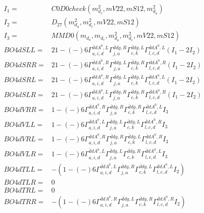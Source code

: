 \documentclass[A4,landscape]{article}
\begin{document}
\begin{align} 
I_1 = & C0D0check(m^2_{d_{{c}}}, mV22, mS12, m^2_{d_{{a}}}) \\ 
I_2 = & D_{27}(m^2_{d_{{a}}}, m^2_{d_{{c}}}, mV22, mS12) \\ 
I_3 = & MMD0(m_{d_{{a}}}, m_{d_{{c}}}, m^2_{d_{{a}}}, m^2_{d_{{c}}}, mV22, mS12) \\ 
  BO4dSLL= & 2   1
-(-)
  6 \Gamma^{\bar{d}d A^0 ,L}_{a, i, d} \Gamma^{\bar{d}d g ,R}_{j, a} \Gamma^{\bar{d}d g ,L}_{c, k} \Gamma^{\bar{d}d A^0 ,L}_{l, c, d} (I_1 - 2 I_2) \\ 
  BO4dSRR= & 2   1
-(-)
  6 \Gamma^{\bar{d}d A^0 ,R}_{a, i, d} \Gamma^{\bar{d}d g ,L}_{j, a} \Gamma^{\bar{d}d g ,R}_{c, k} \Gamma^{\bar{d}d A^0 ,R}_{l, c, d} (I_1 - 2 I_2) \\ 
  BO4dSRL= & 2   1
-(-)
  6 \Gamma^{\bar{d}d A^0 ,R}_{a, i, d} \Gamma^{\bar{d}d g ,L}_{j, a} \Gamma^{\bar{d}d g ,L}_{c, k} \Gamma^{\bar{d}d A^0 ,L}_{l, c, d} (I_1 - 2 I_2) \\ 
  BO4dSLR= & 2   1
-(-)
  6 \Gamma^{\bar{d}d A^0 ,L}_{a, i, d} \Gamma^{\bar{d}d g ,R}_{j, a} \Gamma^{\bar{d}d g ,R}_{c, k} \Gamma^{\bar{d}d A^0 ,R}_{l, c, d} (I_1 - 2 I_2) \\ 
  BO4dVRR= &   1
-(-)
  6 \Gamma^{\bar{d}d A^0 ,R}_{a, i, d} \Gamma^{\bar{d}d g ,R}_{j, a} \Gamma^{\bar{d}d g ,R}_{c, k} \Gamma^{\bar{d}d A^0 ,L}_{l, c, d} I_3 \\ 
  BO4dVLL= &   1
-(-)
  6 \Gamma^{\bar{d}d A^0 ,L}_{a, i, d} \Gamma^{\bar{d}d g ,L}_{j, a} \Gamma^{\bar{d}d g ,L}_{c, k} \Gamma^{\bar{d}d A^0 ,R}_{l, c, d} I_3 \\ 
  BO4dVRL= &   1
-(-)
  6 \Gamma^{\bar{d}d A^0 ,R}_{a, i, d} \Gamma^{\bar{d}d g ,R}_{j, a} \Gamma^{\bar{d}d g ,L}_{c, k} \Gamma^{\bar{d}d A^0 ,R}_{l, c, d} I_3 \\ 
  BO4dVLR= &   1
-(-)
  6 \Gamma^{\bar{d}d A^0 ,L}_{a, i, d} \Gamma^{\bar{d}d g ,L}_{j, a} \Gamma^{\bar{d}d g ,R}_{c, k} \Gamma^{\bar{d}d A^0 ,L}_{l, c, d} I_3 \\ 
  BO4dTLL= & -(  1
-(-)
  6 \Gamma^{\bar{d}d A^0 ,L}_{a, i, d} \Gamma^{\bar{d}d g ,R}_{j, a} \Gamma^{\bar{d}d g ,L}_{c, k} \Gamma^{\bar{d}d A^0 ,L}_{l, c, d} I_2) \\ 
  BO4dTLR= & 0 \\ 
  BO4dTRL= & 0 \\ 
  BO4dTRR= & -(  1
-(-)
  6 \Gamma^{\bar{d}d A^0 ,R}_{a, i, d} \Gamma^{\bar{d}d g ,L}_{j, a} \Gamma^{\bar{d}d g ,R}_{c, k} \Gamma^{\bar{d}d A^0 ,R}_{l, c, d} I_2) \\ 
\end{align} 
\end{document}
